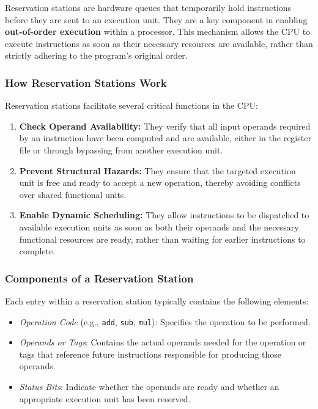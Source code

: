 Reservation stations are hardware queues that temporarily hold instructions before they are sent to an execution unit. They are a key component in enabling \textbf{out-of-order execution} within a processor. This mechanism allows the CPU to execute instructions as soon as their necessary resources are available, rather than strictly adhering to the program's original order.

\subsubsection{How Reservation Stations Work}

Reservation stations facilitate several critical functions in the CPU:

\begin{enumerate}
    \item \textbf{Check Operand Availability:}
    They verify that all input operands required by an instruction have been computed and are available, either in the register file or through bypassing from another execution unit.

    \item \textbf{Prevent Structural Hazards:}
    They ensure that the targeted execution unit is free and ready to accept a new operation, thereby avoiding conflicts over shared functional units.

    \item \textbf{Enable Dynamic Scheduling:}
    They allow instructions to be dispatched to available execution units as soon as both their operands and the necessary functional resources are ready, rather than waiting for earlier instructions to complete.
\end{enumerate}

\subsubsection{Components of a Reservation Station}

Each entry within a reservation station typically contains the following elements:

\begin{itemize}
    \item \textit{Operation Code} (e.g., \texttt{add}, \texttt{sub}, \texttt{mul}): Specifies the operation to be performed.
    \item \textit{Operands or Tags}: Contains the actual operands needed for the operation or tags that reference future instructions responsible for producing those operands.
    \item \textit{Status Bits}: Indicate whether the operands are ready and whether an appropriate execution unit has been reserved.
\end{itemize}

